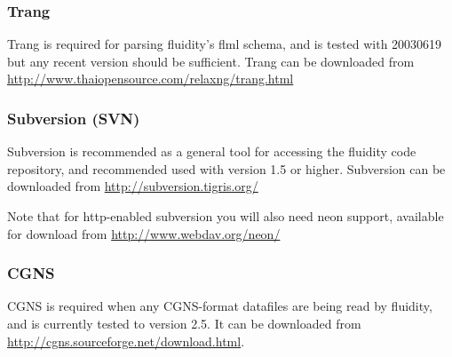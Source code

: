 \subsubsection{Trang}
\label{sect:required_libraries_supporting_trang}

Trang is required for parsing fluidity's flml schema, and is tested with
20030619 but any recent version should be sufficient. Trang can be downloaded
from \url{http://www.thaiopensource.com/relaxng/trang.html}

\subsubsection{Subversion (SVN)}
\label{sect:required_libraries_supportingsvn}

Subversion is recommended as a general tool for accessing the fluidity code
repository, and recommended used with version 1.5 or higher. Subversion can be
downloaded from \url{http://subversion.tigris.org/}

Note that for http-enabled subversion you will also need neon support,
available for download from \url{http://www.webdav.org/neon/}

\subsubsection{CGNS}
\label{sect:required_libraries_supporting_cgns}

CGNS is required when any CGNS-format datafiles are being read by fluidity, and
is currently tested to version 2.5. It can be downloaded from 
\url{http://cgns.sourceforge.net/download.html}.

